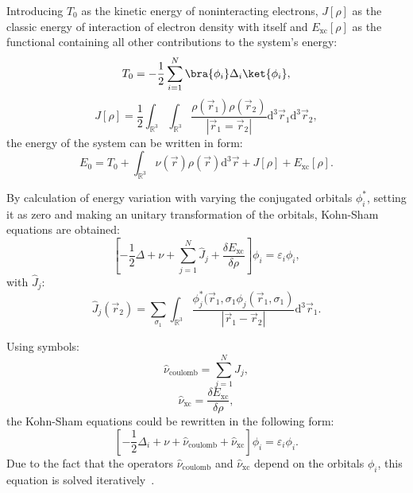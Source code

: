 Introducing $T_0$ as the kinetic energy of noninteracting electrons, $J[\rho]$ as the classic energy of interaction of electron density with itself and $E_{\text{xc}}[\rho]$ as the functional containing all other contributions to the system's energy:
\begin{equation}
    T_0 = -\frac{1}{2} \sum_{i = 1}^N \bra{\phi_i} \Delta_i \ket{\phi_i},
\end{equation}
\begin{equation}
    J[\rho] = \frac{1}{2} \int_{\mathbb{R}^3} \int_{\mathbb{R}^3} \frac{\rho(\vec{r}_1) \rho(\vec{r}_2)}{\left| \vec{r}_1 = \vec{r}_2\right|} \text{d}^3 \vec{r}_1 \text{d}^3 \vec{r}_2,
\end{equation}
the energy of the system can be written in form:
\begin{equation}
    E_0 = T_0 + \int_{\mathbb{R}^3} \nu(\vec{r}) \rho(\vec{r}) \text{d}^3 \vec{r} + J[\rho] + E_{\text{xc}}[\rho].
\end{equation}

By calculation of energy variation with varying the conjugated orbitals $\phi^{*}_i$, setting it as zero and making an unitary transformation of the orbitals, Kohn-Sham equations are obtained:
\begin{equation}
    \left[ -\frac{1}{2} \Delta + \nu + \sum_{j = 1}^N \hat{J}_j + \frac{\delta E_{\text{xc}}}{\delta \rho} \right] \phi_i = \varepsilon_i \phi_i,
\end{equation}
with $\hat{J}_j$:
\begin{equation}
    \hat{J}_j (\vec{r}_2) = \sum_{\sigma_1} \int_{\mathbb{R}^3} \frac{\phi_j^{*} (\vec{r}_1, \sigma_1 \phi_j(\vec{r}_1, \sigma_1)}{\left| \vec{r}_1 - \vec{r}_2 \right|} \text{d}^3 \vec{r}_1.
\end{equation}

Using symbols:
\begin{equation}
    \hat{\nu}_{\text{coulomb}} = \sum_{j = 1}^N \hat{J}_j,
\end{equation}
\begin{equation}
    \hat{\nu}_{\text{xc}} = \frac{\delta E_{\text{xc}}}{\delta \rho},
\end{equation}
the Kohn-Sham equations could be rewritten in the following form:
\begin{equation}
    \left[ -\frac{1}{2} \Delta_i + \nu + \hat{\nu}_{\text{coulomb}} + \hat{\nu}_{{\text{xc}}} \right] \phi_i = \varepsilon_i \phi_i.
\end{equation}
Due to the fact that the operators $\hat{\nu}_{\text{coulomb}}$ and $\hat{\nu}_{\text{xc}}$ depend on the orbitals $\phi_i$, this equation is solved iteratively~\cite{nalewajski-perspectives}.

